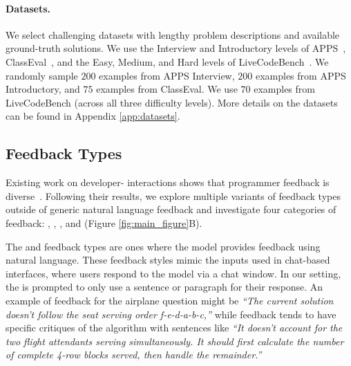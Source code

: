 \paragraph{Datasets.} 
We select challenging datasets with lengthy problem descriptions and available ground-truth solutions.
We use the Interview and Introductory levels of APPS~\citep{hendrycks2021apps}, ClassEval~\citep{du2023classeval}, and the Easy, Medium, and Hard levels of LiveCodeBench~\citep{jain2024livecodebench}.
We randomly sample $200$ examples from APPS Interview, $200$ examples from APPS Introductory, and $75$ examples from ClassEval. 
We use $70$ examples from LiveCodeBench (across all three difficulty levels). 
More details on the datasets can be found in Appendix \ref{app:datasets}.

\subsection{Feedback Types} 
Existing work on developer-\cm{} interactions shows that programmer feedback is diverse~\citep{chidambaram2024socratic}. 
Following their results, we explore multiple variants of feedback types outside of generic natural language feedback and investigate four categories of feedback: \para, \sent, \ir, and \cf{} (Figure \ref{fig:main_figure}B).

The \sent{} and \para{} feedback types are ones where the \user{} model provides feedback using natural language.
These feedback styles mimic the inputs used in chat-based interfaces, where users respond to the model via a chat window. In our setting, the \user{} is prompted to only use a sentence or paragraph for their response. 
An example of \sent{} feedback for the airplane question might be \textit{``The current solution doesn't follow the seat serving order f-e-d-a-b-c,''} while \para{} feedback tends to have specific critiques of the algorithm with sentences like \textit{``It doesn't account for the two flight attendants serving simultaneously. It should first calculate the number of complete 4-row blocks served, then handle the remainder.''} 


